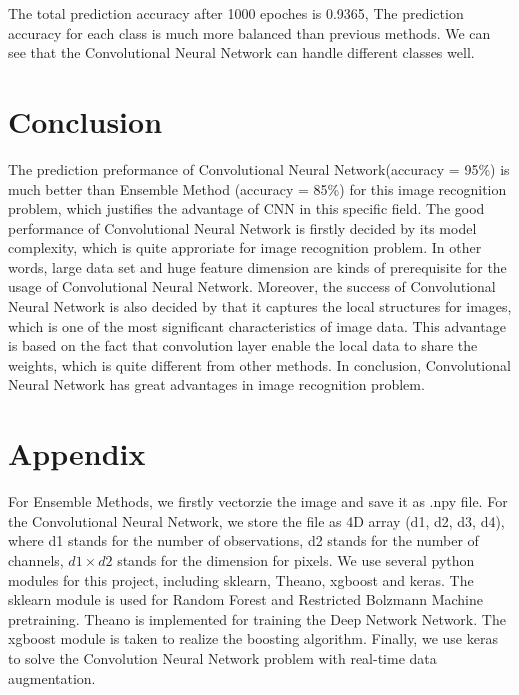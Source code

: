 \documentclass[paper=a4, fontsize=11pt]{scrartcl}
\begin{document}
The total prediction accuracy after 1000 epoches is 0.9365, The prediction accuracy for each class is much more balanced than previous methods. We can see that the Convolutional Neural Network can handle different classes well.

\section*{Conclusion}
The prediction preformance of Convolutional Neural Network(accuracy = 95\%) is much better than Ensemble Method (accuracy = 85\%) for this image recognition problem, which justifies the advantage of CNN in this specific field. The good performance of Convolutional Neural Network is firstly decided by its model complexity, which is quite approriate for image recognition problem. In other words, large data set and huge feature dimension are kinds of prerequisite for the usage of Convolutional Neural Network. Moreover, the success of Convolutional Neural Network is also decided by that it captures the local structures for images, which is one of the most significant characteristics of image data. This advantage is based on the fact that convolution layer enable the local data to share the weights, which is quite different from other methods. In conclusion, Convolutional Neural Network has great advantages in image recognition problem.


\section*{Appendix}
For Ensemble Methods, we firstly vectorzie the image and save it as .npy file. For the Convolutional Neural Network, we store the file as 4D array (d1, d2, d3, d4), where d1 stands for the number of observations, d2 stands for the number of channels, $d1 \times d2$ stands for the dimension for pixels.
We use several python modules for this project, including sklearn, Theano, xgboost and keras. The sklearn module is used for Random Forest and Restricted Bolzmann Machine pretraining. Theano is implemented for training the Deep Network Network. The xgboost module is taken to realize the boosting algorithm. Finally, we use keras to solve the Convolution Neural Network problem with real-time data augmentation.
\end{document}

